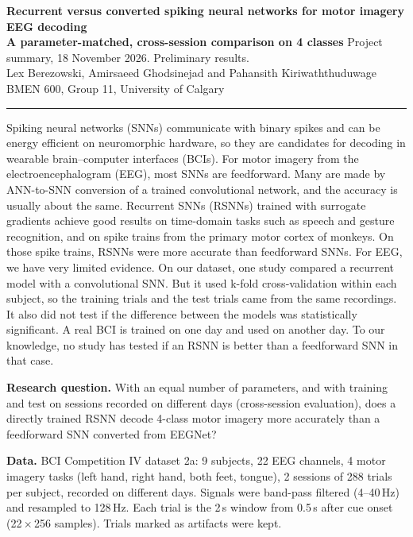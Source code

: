 \documentclass[10pt,letterpaper]{article}
\newcommand{\head}[1]{\textbf{#1.}}
\newcommand{\sect}[1]{\par\vspace{3pt}{\large\bfseries #1}\par\vspace{-1pt}}
\begin{document}
\fontsize{9.7}{11.6}\selectfont
{\Large\bfseries Recurrent versus converted spiking neural networks for motor imagery EEG decoding}\\[2pt]
{\bfseries A parameter-matched, cross-session comparison on 4 classes}
\hfill {\small Project summary, 18 November 2026. Preliminary results.}\\[1pt]
Lex Berezowski, Amirsaeed Ghodsinejad and Pahansith Kiriwaththuduwage \hfill BMEN 600, Group 11, University of Calgary
\par\vspace{1pt}\hrule

\sect{Motivation}
Spiking neural networks (SNNs) communicate with binary spikes and can be energy efficient on neuromorphic hardware,
so they are candidates for decoding in wearable brain--computer interfaces (BCIs). For motor imagery from the electroencephalogram (EEG), most SNNs are feedforward.
Many are made by ANN-to-SNN conversion of a trained convolutional network, and the accuracy is usually about the same.
Recurrent SNNs (RSNNs) trained with surrogate gradients achieve good results on time-domain tasks such as speech and
gesture recognition, and on spike trains from the primary motor cortex of monkeys. On those spike trains, RSNNs were
more accurate than feedforward SNNs. For EEG, we have very limited evidence. On our dataset, one study compared a
recurrent model with a convolutional SNN. But it used k-fold cross-validation within each subject, so the training
trials and the test trials came from the same recordings. It also did not test if the difference between the models
was statistically significant. A real BCI is trained on one day and used on another day. To our knowledge, no study
has tested if an RSNN is better than a feedforward SNN in that case.

\head{Research question} With an equal number of parameters, and with training and test on sessions recorded on
different days (cross-session evaluation), does a directly trained RSNN decode 4-class motor imagery more accurately
than a feedforward SNN converted from EEGNet?

\sect{Methods}
\head{Data} BCI Competition IV dataset 2a: 9 subjects, 22 EEG channels, 4 motor imagery tasks (left hand, right hand,
both feet, tongue), 2 sessions of 288 trials per subject, recorded on different days. Signals were band-pass filtered
(4--40\,Hz) and resampled to 128\,Hz. Each trial is the 2\,s window from 0.5\,s after cue onset
(22\,$\times$\,256 samples). Trials marked as artifacts were kept.
\end{document}
